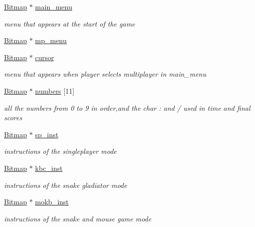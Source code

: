 \begin{DoxyCompactItemize}
\hyperlink{structBitmap}{Bitmap} $\ast$ \hyperlink{group__graphics_ga024eb6d4380a6df2938202e45547c241}{main\+\_\+menu}
\begin{DoxyCompactList}\small\item\em menu that appears at the start of the game \end{DoxyCompactList}\item 
\hyperlink{structBitmap}{Bitmap} $\ast$ \hyperlink{group__graphics_ga65a5f6d63fc1498c0bace1310dac202f}{mp\+\_\+menu}
\item 
\hyperlink{structBitmap}{Bitmap} $\ast$ \hyperlink{group__graphics_gaa9e2b675fd059f98d6fc79bff67f7918}{cursor}
\begin{DoxyCompactList}\small\item\em menu that appears when player selects multiplayer in main\+\_\+menu \end{DoxyCompactList}\item 
\hyperlink{structBitmap}{Bitmap} $\ast$ \hyperlink{group__graphics_ga055c85bff730277d284b6e00bb7d1b62}{numbers} \mbox{[}11\mbox{]}
\begin{DoxyCompactList}\small\item\em all the numbers from 0 to 9 in order,and the char \textquotesingle{}\+:\textquotesingle{} and \textquotesingle{}/\textquotesingle{} used in time and final scores \end{DoxyCompactList}\item 
\hyperlink{structBitmap}{Bitmap} $\ast$ \hyperlink{group__graphics_ga067f54df47f8ccad03f63d3b683f73a5}{sp\+\_\+inst}
\begin{DoxyCompactList}\small\item\em instructions of the singleplayer mode \end{DoxyCompactList}\item 
\hyperlink{structBitmap}{Bitmap} $\ast$ \hyperlink{group__graphics_ga4096188495e68d783bf3b8ac7871b7fa}{kbc\+\_\+inst}
\begin{DoxyCompactList}\small\item\em instructions of the snake gladiator mode \end{DoxyCompactList}\item 
\hyperlink{structBitmap}{Bitmap} $\ast$ \hyperlink{group__graphics_gaa403b7ac82d3c61224b7064f29790bd3}{mokb\+\_\+inst}
\begin{DoxyCompactList}\small\item\em instructions of the snake and mouse game mode \end{DoxyCompactList}\item 

\end{DoxyCompactItemize}
